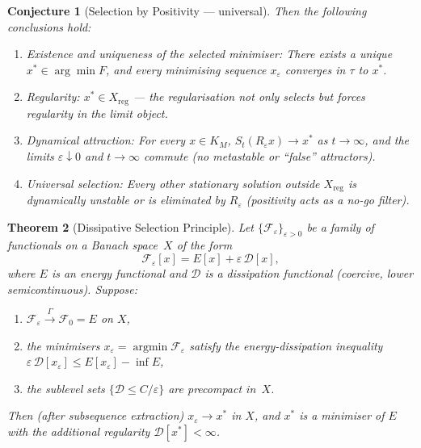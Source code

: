 \documentclass[12pt,a4paper]{article}
\newtheorem{theorem}{Theorem}[section]
\newtheorem{conjecture}[theorem]{Conjecture}
\theoremstyle{definition}
\theoremstyle{remark}
\begin{document}
\begin{conjecture}[Selection by Positivity --- universal]
Then the following conclusions hold:
\begin{enumerate}
\item[\textup{(C1)}] \emph{Existence and uniqueness of the selected minimiser:} There exists a unique $x^* \in \arg\min F$, and every minimising sequence $x_\varepsilon$ converges in $\tau$ to $x^*$.

\item[\textup{(C2)}] \emph{Regularity:} $x^* \in X_{\mathrm{reg}}$ --- the regularisation not only selects but \emph{forces} regularity in the limit object.

\item[\textup{(C3)}] \emph{Dynamical attraction:} For every $x \in K_M$, $S_t(R_\varepsilon x) \to x^*$ as $t \to \infty$, and the limits $\varepsilon \downarrow 0$ and $t \to \infty$ commute (no metastable or ``false'' attractors).

\item[\textup{(C4)}] \emph{Universal selection:} Every other stationary solution outside $X_{\mathrm{reg}}$ is dynamically unstable or is eliminated by $R_\varepsilon$ (positivity acts as a no-go filter).
\end{enumerate}
\end{conjecture}

\begin{theorem}[Dissipative Selection Principle]\label{thm:dissipative-selection}
Let $\{\mathcal{F}_\varepsilon\}_{\varepsilon > 0}$ be a family of functionals on a Banach space~$X$ of the form
\[
  \mathcal{F}_\varepsilon[x] = E[x] + \varepsilon\,\mathcal{D}[x],
\]
where $E$ is an energy functional and $\mathcal{D}$ is a dissipation functional (coercive, lower semicontinuous). Suppose:
\begin{enumerate}
\item[\textup{(DS1)}] $\mathcal{F}_\varepsilon \xrightarrow{\Gamma} \mathcal{F}_0 = E$ on $X$,
\item[\textup{(DS2)}] the minimisers $x_\varepsilon = \operatorname{argmin} \mathcal{F}_\varepsilon$ satisfy the energy-dissipation inequality $\varepsilon\,\mathcal{D}[x_\varepsilon] \leq E[x_\varepsilon] - \inf E$,
\item[\textup{(DS3)}] the sublevel sets $\{\mathcal{D} \leq C/\varepsilon\}$ are precompact in~$X$.
\end{enumerate}
Then (after subsequence extraction) $x_\varepsilon \to x^*$ in $X$, and $x^*$ is a minimiser of $E$ with the additional regularity $\mathcal{D}[x^*] < \infty$.
\end{theorem}
\end{document}
